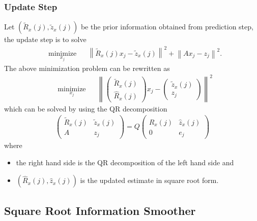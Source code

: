 \documentclass[microtype]{gtpart}     %
\theoremstyle{definition}
\newcommand{\norm}[1]{\left\lVert#1\right\rVert}
\begin{document}
\subsubsection{Update Step}

Let $(\tilde{R}_x(j), \tilde{z}_x(j))$ be the prior information obtained from prediction step, 
the update step is to solve
\begin{align*}
	& \underset{x_j}{\text{minimize}} & &\norm{\tilde{R}_x(j)x_j - \tilde{z}_x(j)}^2 + \norm{Ax_j - z_j}^2.
\end{align*}
The above minimization problem can be rewritten as
\begin{align*}
	& \underset{x_j}{\text{minimize}} & &\norm{
	\begin{pmatrix}
	\tilde{R}_x(j) \\ \hat{R}_x(j)
	\end{pmatrix}x_j - 
	\begin{pmatrix}
	\tilde{z}_x(j) \\  z_j
	\end{pmatrix}}^2
\end{align*}
which can be solved by using the QR decomposition
\begin{align*}
	\begin{pmatrix}
		\tilde{R}_x(j) &\tilde{z}_x(j) \\ 
		A &z_j
	\end{pmatrix} = Q
	\begin{pmatrix}
		\hat{R}_x(j) &\hat{z}_x(j) \\
		0 &e_j
	\end{pmatrix}
\end{align*}
where
\begin{itemize}
	\item the right hand side is the QR decomposition of the left hand side and
	\item $(\hat{R}_x(j), \hat{z}_x(j))$ is the updated estimate in square root form.
\end{itemize}

\subsection{Square Root Information Smoother}
\end{document}
